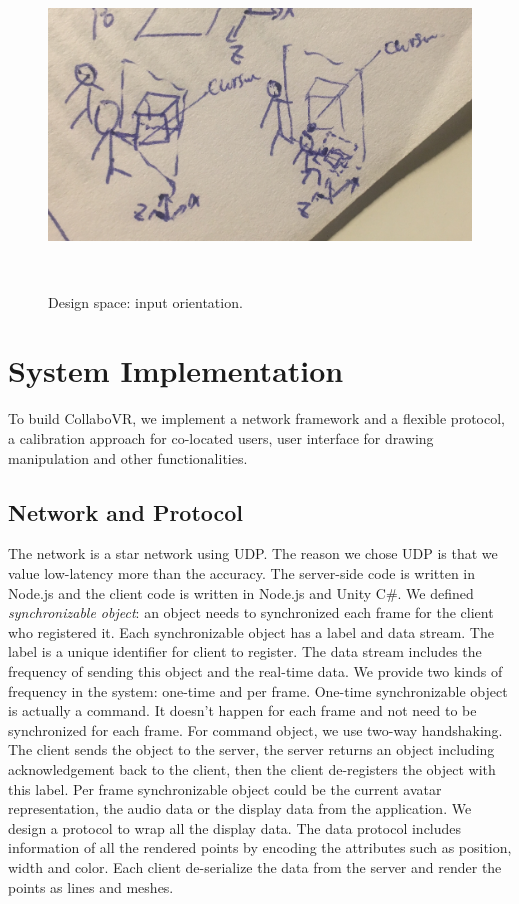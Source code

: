 \documentclass{sigchi}
\begin{document}
\begin{figure}[b!]
 \centering
 \includegraphics[width=0.9\columnwidth]{inputorientation.jpg}
 \caption{Design space: input orientation.
 }~\label{fig:inputorientation}
\end{figure}

\section{System Implementation}
To build CollaboVR, we implement a network framework and a flexible protocol, a calibration approach for co-located users, user interface for drawing manipulation and other functionalities.

\subsection{Network and Protocol}
The network is a star network using UDP. The reason we chose UDP is that we value low-latency more than the accuracy. The server-side code is written in Node.js and the client code is written in Node.js and Unity C\#. We defined \textit{synchronizable object}: an object needs to synchronized each frame for the client who registered it. Each synchronizable object has a label and data stream. The label is a unique identifier for client to register. The data stream includes the frequency of sending this object and the real-time data. We provide two kinds of frequency in the system: one-time and per frame. One-time synchronizable object is actually a command. It doesn't happen for each frame and not need to be synchronized for each frame. For command object, we use two-way handshaking. The client sends the object to the server, the server returns an object including acknowledgement back to the client, then the client de-registers the object with this label. Per frame synchronizable object could be the current avatar representation, the audio data or the display data from the application. We design a protocol to wrap all the display data. The data protocol includes information of all the rendered points by encoding the attributes such as position, width and color. Each client de-serialize the data from the server and render the points as lines and meshes.
\end{document}
